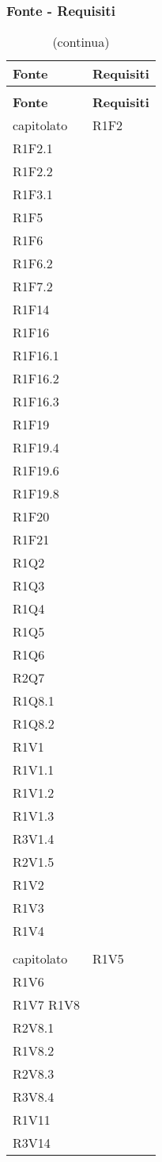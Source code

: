 \subsubsection{Fonte - Requisiti}


\begin{longtable}{ >{\centering}p{}
		>{\centering}p{}}
	\caption{Tabella di tracciamento fonte-requisiti}\\
	\rowcolorhead 
	\textbf{\color{white}Fonte}
	& \textbf{\color{white}Requisiti} 
	\tabularnewline 	
	\endfirsthead
	\rowcolor{white}\caption[]{(continua)} \\
	\rowcolorhead 
	\textbf{\color{white}Fonte}
	& \textbf{\color{white}Requisiti} 
	\tabularnewline 
	\endhead
	capitolato & R1F2\\
	R1F2.1 \\R1F2.2 \\R1F3.1 \\R1F5 \\R1F6 \\R1F6.2 \\R1F7.2 \\R1F14 \\R1F16 \\R1F16.1 \\R1F16.2 \\R1F16.3 \\R1F19 \\R1F19.4 \\R1F19.6 \\R1F19.8 \\R1F20 \\R1F21 \\R1Q2 \\R1Q3 \\R1Q4 \\R1Q5 \\R1Q6 \\R2Q7 \\R1Q8.1 \\R1Q8.2 \\R1V1 \\R1V1.1 \\R1V1.2 \\R1V1.3 \\R3V1.4 \\R2V1.5 \\R1V2 \\ R1V3 \\R1V4 
	
	\tabularnewline
	\rowcolordark &	\tabularnewline
	 capitolato & R1V5 \\ R1V6 \\R1V7 R1V8 \\R2V8.1 \\R1V8.2 \\ R2V8.3 \\R3V8.4 \\R1V11 \\R3V14
	 

\end{longtable}

